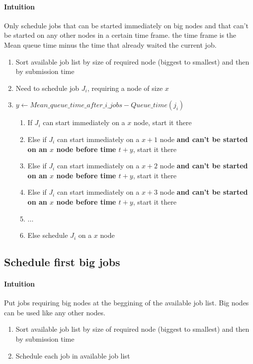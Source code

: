 \documentclass[a4paper]{article}
\begin{document}
\paragraph{Intuition} Only schedule jobs that can be started immediately on big nodes and that can't be started on any other nodes in a certain time frame.
the time frame is the Mean queue time minus the time that already waited the current job.
\begin{enumerate}
	\item Sort available job list by size of required node (biggest to smallest) and then by submission time
	\item Need to schedule job $J_i$, requiring a node of size $x$
	\item \textbf{$y \gets Mean\_queue\_time\_after\_i\_jobs - Queue\_time(j_i)$}
	\begin{enumerate}
		\item If $J_i$ can start immediately on a $x$ node, start it there
		\item Else if $J_i$ can start immediately on a $x+1$ node \textbf{and can't be started on an $x$ node before time $t + y$}, start it there
		\item Else if $J_i$ can start immediately on a $x+2$ node \textbf{and can't be started on an $x$ node before time $t + y$}, start it there
		\item Else if $J_i$ can start immediately on a $x+3$ node \textbf{and can't be started on an $x$ node before time $t + y$}, start it there
		\item ...
		\item Else schedule $J_i$ on a $x$ node
	\end{enumerate}
\end{enumerate}

\subsection{Schedule first big jobs}
\paragraph{Intuition} Put jobs requiring big nodes at the beggining of the available job list.
Big nodes can be used like any other nodes.
\begin{enumerate}
	\item Sort available job list by size of required node (biggest to smallest) and then by submission time
	\item Schedule each job in available job list
\end{enumerate}
\end{document}

